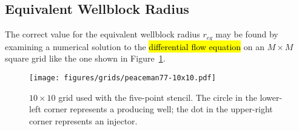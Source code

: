 \subsection{Equivalent Wellblock Radius} %
\label{sub:equivalent_wellblock_radius}
The correct value for the equivalent wellblock radius $r_{eq}$ may be found by examining a numerical solution to the \hl{differential flow equation} on an $M\times M$ square grid like the one shown in Figure~\ref{fig:peaceman-grid}.

\begin{figure}[htbp]
    \centering
    \texttt{[image: figures/grids/peaceman77-10x10.pdf]}
    \caption{$10\times 10$ grid used with the five-point stencil. The circle in the lower-left corner represents a producing well; the dot in the upper-right corner represents an injector.}
    \label{fig:peaceman-grid}
\end{figure}





